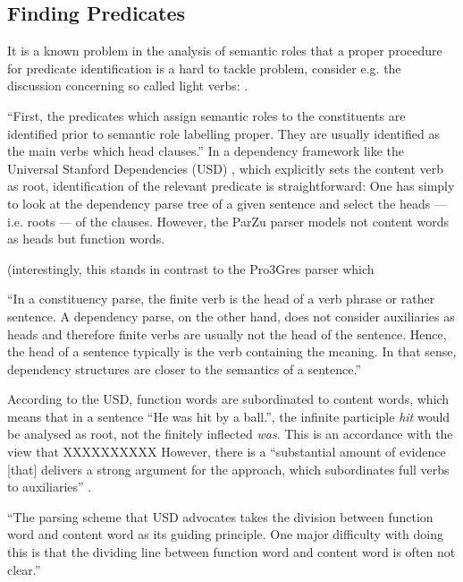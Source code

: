 \subsection{Finding Predicates}

It is a known problem in the analysis of semantic roles that a proper procedure for predicate
identification is a hard to tackle problem, consider e.g. the discussion concerning so called
light verbs: \cite{wittenberg2016light}.

``First, the predicates which assign semantic roles to the constituents are identified
prior to semantic role labelling proper. They are usually identified as the main verbs
which head clauses.'' \citep[p.~74]{samardzic2013dynamics} In a dependency framework like
the Universal Stanford Dependencies (USD) \citep{de2014universal}, which explicitly sets
the content verb as root, identification of the relevant predicate is straightforward: One
has simply to look at the dependency parse tree of a given sentence and select the heads ---
i.e. roots --- of the clauses.  However, the ParZu parser models not content words as heads
but function words.

(interestingly, this stands in contrast to the Pro3Gres parser \citep{schneider2008hybrid} which

``In a constituency parse, the finite verb is the head of a verb phrase or rather sentence.
A dependency parse, on the other hand, does not consider auxiliaries as heads and therefore
finite verbs are usually not the head of the sentence.  Hence, the head of a sentence typically
is the verb containing the meaning.  In that sense, dependency structures are closer to the
semantics of a sentence.'' \citep[p.~6f.]{aepli2018parsing}

According to the USD, function words are subordinated to content words, which means that
in a sentence ``He was hit by a ball.'', the infinite participle \textit{hit} would be
analysed as root, not the finitely inflected \textit{was}.  This is an accordance with the
view that XXXXXXXXXX However, there is a ``substantial amount of evidence [that] delivers a
strong argument for the \textelp{} approach, which subordinates full verbs to auxiliaries''
\cite{gross2015dependency}.

``The parsing scheme that USD advocates takes the division between function word and content
word as its guiding principle.  One major difficulty with doing this is that the dividing line
between function word and content word is often not clear.'' \cite{gross2015dependency}


